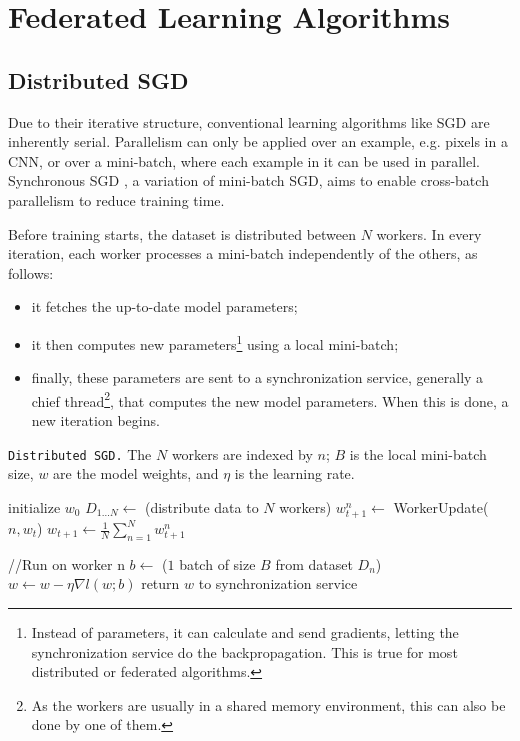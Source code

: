 \section{Federated Learning Algorithms}
\subsection{Distributed SGD}
Due to their iterative structure, conventional learning algorithms like SGD are inherently serial. Parallelism can only be applied over an example, e.g. pixels in a CNN, or over a mini-batch, where each example in it can be used in parallel. Synchronous SGD \cite{parallel_SGD}, a variation of mini-batch SGD, aims to enable cross-batch parallelism to reduce training time.

Before training starts, the dataset is distributed between \(N\) workers. In every iteration, each worker processes a mini-batch independently of the others, as follows:
\begin{itemize}
    \item it fetches the up-to-date model parameters;
    \item it then computes new parameters\footnote{Instead of parameters, it can calculate and send gradients, letting the synchronization service do the backpropagation. This is true for most distributed or federated algorithms.} using a local mini-batch;
    \item finally, these parameters are sent to a synchronization service, generally a chief thread\footnote{As the workers are usually in a shared memory environment, this can also be done by one of them.}, that computes the new model parameters. When this is done, a new iteration begins.
\end{itemize}

\begin{algorithm}[H]
    \caption[Distributed SGD]{\texttt{Distributed SGD.} The \(N\) workers are indexed by \(n\); \(B\) is the local mini-batch size, \(w\) are the model weights, and \(\eta\) is the learning rate.}
    \label{alg:Distributed_SGD}
    \begin{algorithmic}
            \State initialize $w_0$
            \State $D_{1 \ldots N} \gets$ (distribute data to $N$ workers)
                    \State $w_{t+1}^n \gets$ WorkerUpdate($n,w_t$)
                \EndFor
                \State $w_{t+1} \gets \frac{1}{N} \sum_{n=1}^{N} w_{t+1}^n$
            \EndFor
        \EndFunction
        
         //Run on worker n
            \State $b \gets $ ($1$ batch of size $B$ from dataset $D_{n}$)
            \State $w \gets w - \eta \nabla l(w;b)$
            \State return $w$ to synchronization service
        \EndFunction
    \end{algorithmic}
\end{algorithm}

